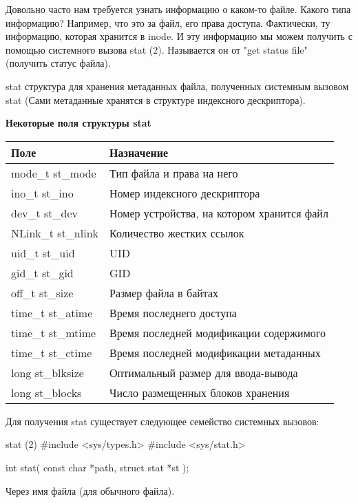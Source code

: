 Довольно часто нам требуется узнать  информацию о каком-то файле. Какого типа информацию? Например, что это за файл, его права доступа. Фактически, ту информацию, которая хранится в inode. И эту информацию мы можем получить с помощью системного вызова stat (2). Называется он от "get status file" (получить статус файла).

\begin{defi}{stat}
	структура для хранения метаданных файла, полученных системным вызовом stat (Сами метаданные хранятся в структуре индексного дескриптора).
\end{defi}

\textbf{Некоторые поля структуры stat}

\begin{center}
\begin{tabular}{l|l}

	\textbf{Поле}	&	\textbf{Назначение} \\
	\hline
	mode\_t st\_mode	&	Тип файла и права на него \\
	\hline
	ino\_t st\_ino	&	Номер индексного дескриптора \\
	\hline
	dev\_t st\_dev	&	Номер устройства, на котором хранится файл \\
	\hline
	NLink\_t st\_nlink	&	Количество жестких ссылок \\
	\hline
	uid\_t st\_uid	&	UID \\
	\hline
	gid\_t st\_gid	&	GID \\
	\hline
	off\_t st\_size	&	Размер файла в байтах \\
	\hline
	time\_t st\_atime		&	Время последнего доступа \\
	\hline
	time\_t st\_mtime		&	Время последней модификации содержимого \\
	\hline
	time\_t st\_ctime		&	Время последней модификации метаданных \\
	\hline
	long st\_blksize		&	Оптимальный размер для ввода-вывода \\
	\hline
	long st\_blocks		&	Число размещенных блоков хранения \\
	\hline

\end{tabular}
\end{center}

Для получения stat существует следующее семейство системных вызовов:

\begin{CCode}{stat (2)}
	#include <sys/types.h>
	#include <sys/stat.h>

	int stat(
		const char *path, 
		struct stat *st
	); \end{CCode}
Через имя файла (для обычного файла).
			
